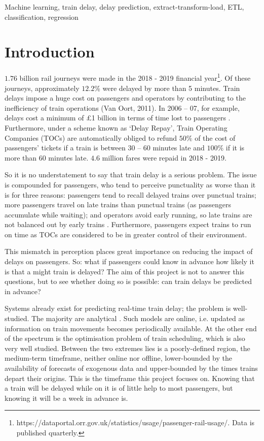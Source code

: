 \documentclass[12pt,a4paper]{article}
\begin{document}
\begin{keywords}
Machine learning, train delay, delay prediction, extract-transform-load, ETL, classification, regression
\end{keywords}

\clearpage
\section{Introduction}
\label{section:introduction}

$1.76$ billion rail journeys were made in the 2018 - 2019 financial year\footnote{https://dataportal.orr.gov.uk/statistics/usage/passenger-rail-usage/. Data is published quarterly.}. Of these journeys, approximately $12.2$\% were delayed by more than 5 minutes. Train delays impose a huge cost on passengers and operators by contributing to the inefficiency of train operations (Van Oort, 2011). In 2006 – 07, for example, delays cost a minimum of £1 billion in terms of time lost to passengers \cite{nao_2008}. Furthermore, under a scheme known as ‘Delay Repay’, Train Operating Companies (TOCs) are automatically obliged to refund $50\%$ of the cost of passengers’ tickets if a train is between 30 – 60 minutes late and $100\%$ if it is more than 60 minutes late. $4.6$ million fares were repaid in 2018 - 2019.

So it is no understatement to say that train delay is a serious problem. The issue is compounded for passengers, who tend to perceive punctuality as worse than it is for three reasons: passengers tend to recall delayed trains over punctual trains; more passengers travel on late trains than punctual trains (as passengers accumulate while waiting); and operators avoid early running, so late trains are not balanced out by early trains \cite[p.~130]{harris_godward_1992}. Furthermore, passengers expect trains to run on time as TOCs are considered to be in greater control of their environment.

This mismatch in perception places great importance on reducing the impact of delays on passengers. So: what if passengers could know in advance how likely it is that a might train is delayed? The aim of this project is not to answer this questions, but to see whether doing so is possible: can train delays be predicted in advance? 

Systems already exist for predicting real-time train delay; the problem is well-studied. The majority are analytical \cite{oneto_et_al_2016}. Such models are online, i.e. updated as information on train movements becomes periodically available. At the other end of the spectrum is the optimisation problem of train scheduling, which is also very well studied. Between the two extremes lies is a poorly-defined region, the medium-term timeframe, neither online nor offline, lower-bounded by the availability of forecasts of exogenous data and upper-bounded by the times trains depart their origins. This is the timeframe this project focuses on. Knowing that a train will be delayed while on it is of little help to most passengers, but knowing it will be a week in advance is. 
\end{document}
